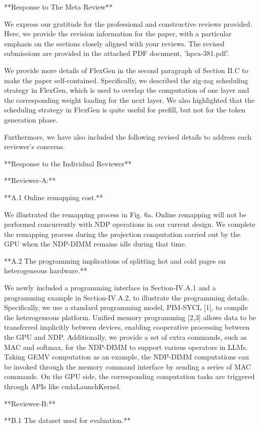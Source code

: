 **Response to The Meta Review**

We express our gratitude for the professional and constructive reviews provided. Here, we provide the revision information for the paper, with a particular emphasis on the sections closely aligned with your reviews. The revised submissions are provided in the attached PDF document, 'hpca-381.pdf'.

We provide more details of FlexGen in the second paragraph of Section II.C to make the paper self-contained. Specifically, we described the zig-zag scheduling strategy in FlexGen, which is used to overlap the computation of one layer and the corresponding weight loading for the next layer. We also highlighted that the scheduling strategy in FlexGen is quite useful for prefill, but not for the token generation phase.

Furthermore, we have also included the following revised details to address each reviewer's concerns. 

**Response to the Individual Reviewer**

**Reviewer-A:**

**A.1 Online remapping cost.**

We illustrated the remapping process in Fig. 6a. Online remapping will not be performed concurrently with NDP operations in our current design. We complete the remapping process during the projection computation carried out by the GPU when the NDP-DIMM remains idle during that time.

**A.2 The programming implications of splitting hot and cold pages on heterogeneous hardware.**

We newly included a programming interface in Section-IV.A.1 and a programming example in Section-IV.A.2, to illustrate the programming details. Specifically, we use a standard programming model, PIM-SYCL [1], to compile the heterogeneous platform. Unified memory programming [2,3] allows data to be transferred implicitly between devices, enabling cooperative processing between the GPU and NDP. Additionally, we provide a set of extra commands, such as MAC and softmax, for the NDP-DIMM to support various operators in LLMs. Taking GEMV computation as an example, the NDP-DIMM computations can be invoked through the memory command interface by sending a series of MAC commands. On the GPU side, the corresponding computation tasks are triggered through APIs like cudaLaunchKernel.

**Reviewer-B:**

**B.1 The dataset used for evaluation.**

